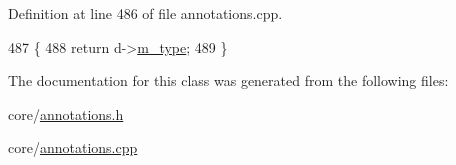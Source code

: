 Definition at line 486 of file annotations.\+cpp.


\begin{DoxyCode}
487 \{
488     \textcolor{keywordflow}{return} d->\hyperlink{classAnnotation_1_1Revision_1_1Private_a2cea518ec5656c3a4e48d18d40bcf7b5}{m\_type};
489 \}
\end{DoxyCode}


The documentation for this class was generated from the following files\+:\begin{DoxyCompactItemize}
\item 
core/\hyperlink{annotations_8h}{annotations.\+h}\item 
core/\hyperlink{annotations_8cpp}{annotations.\+cpp}\end{DoxyCompactItemize}
